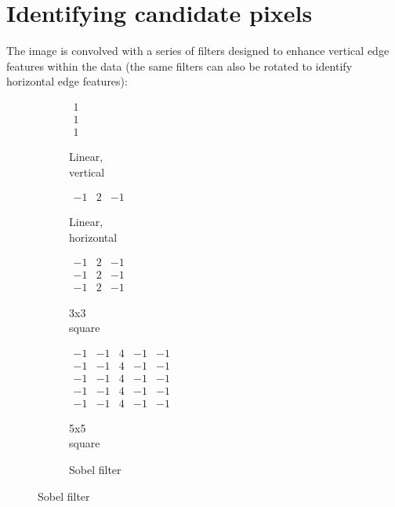 \documentclass[10pt,fleqn]{article}
\begin{document}
\section{Identifying candidate pixels}

The image is convolved with a series of filters designed to enhance vertical edge features within the data (the same filters can also be rotated to identify horizontal edge features):

\begin{figure}[!ht]	%
\caption{Edge filters applied to the raw image}
\centering
\label{fig:filters}
\begin{footnotesize}

%
\begin{subfigure}[t]{0.15\textwidth}
\caption{Linear,\\ vertical}
$ \begin{matrix} 1 \\ 1 \\ 1 \end{matrix} $
\end{subfigure}
%
\begin{subfigure}[t]{0.15\textwidth}
\caption{Linear,\\ horizontal}
$ \begin{matrix} -1 & 2 & -1 \end{matrix} $
\end{subfigure}
%
\begin{subfigure}[t]{0.15\textwidth}
\caption{3x3 \\ square}
$ \begin{matrix} -1 & 2 & -1 \\ -1 & 2 & -1 \\ -1 & 2 & -1 \end{matrix} $
\end{subfigure}
%
\begin{subfigure}[t]{0.2\textwidth}
\caption{5x5 \\ square}
$ \begin{matrix} -1 & -1 & 4 & -1 & -1 \\ -1 & -1 & 4 & -1 & -1 \\ -1 & -1 & 4 & -1 & -1 \\ -1 & -1 & 4 & -1 & -1 \\ -1 & -1 & 4 & -1 & -1 \end{matrix} $
\end{subfigure}
%
\begin{subfigure}[t]{0.15\textwidth}
\caption{Sobel filter\\}

\end{subfigure}
\end{footnotesize}
\end{figure}
\end{document}
